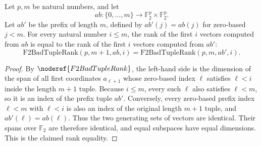 \begin{helper}
Let \(p,m\) be natural numbers, and let
\[
  ab:\{0,\ldots,m\}\to \mathbb F_2^p\times\mathbb F_2^p.
\]
Let \(ab'\) be the prefix of length \(m\), defined by \(ab'(j)=ab(j)\) for
zero-based \(j<m\). For every natural number \(i\le m\), the rank of the first
\(i\) vectors computed from \(ab\) is equal to the rank of the first \(i\)
vectors computed from \(ab'\):
\[
  \mathrm{F2BadTupleRank}(p,m+1,ab,i)
  =
  \mathrm{F2BadTupleRank}(p,m,ab',i).
\]
\end{helper}
\begin{proof}
By \(\noderef{F2BadTupleRank}\), the left-hand side is the dimension of the
span of all first coordinates \(a_{\ell+1}\) whose zero-based index
\(\ell\) satisfies \(\ell<i\) inside the length \(m+1\) tuple. Because
\(i\le m\), every such \(\ell\) also satisfies \(\ell<m\), so it is an index of
the prefix tuple \(ab'\). Conversely, every zero-based prefix index
\(\ell<m\) with \(\ell<i\) is also an index of the original length \(m+1\)
tuple, and \(ab'(\ell)=ab(\ell)\). Thus the two generating sets of vectors are
identical. Their spans over \(\mathbb F_2\) are therefore identical, and equal
subspaces have equal dimensions. This is the claimed rank equality.
\end{proof}
